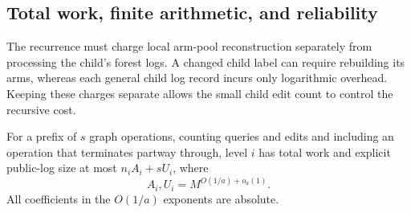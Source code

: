 \subsection{Total work, finite arithmetic, and reliability}

The recurrence must charge local arm-pool reconstruction separately
from processing the child's forest logs.  A changed child label can
require rebuilding its arms, whereas each general child log record
incurs only logarithmic overhead.  Keeping these charges separate
allows the small child edit count to control the recursive cost.

\begin{lemma}
\label{update:recurrences}
For a prefix of $s$ graph operations, counting queries and edits
and including an operation that terminates partway through,
level $i$ has total work and explicit public-log size at most
$n_iA_i+sU_i$, where
\[
                  A_i,U_i=M^{O(1/a)+o_a(1)}.
\]
All coefficients in the $O(1/a)$ exponents are absolute.
\end{lemma}


